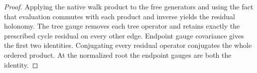 \begin{proof}\leanok
    Applying the native walk product to the free generators and using the fact that evaluation
    commutes with each product and inverse yields the residual holonomy.
    The tree gauge removes each tree operator and retains exactly the
    prescribed cycle residual on every other edge. Endpoint gauge
    covariance gives the first two identities. Conjugating every
    residual operator conjugates the whole ordered product. At the
    normalized root the endpoint gauges are both the identity.
\end{proof}
